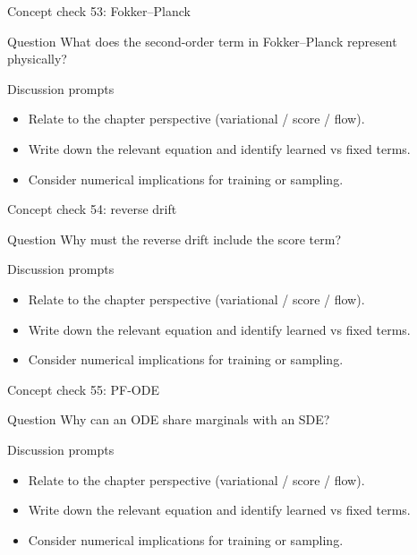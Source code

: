 \documentclass[aspectratio=169]{beamer}
\begin{document}
\begin{frame}{Concept check 53: Fokker--Planck}
\begin{block}{Question}
What does the second-order term in Fokker--Planck represent physically?
\end{block}
\begin{block}{Discussion prompts}
\begin{itemize}
\item Relate to the chapter perspective (variational / score / flow).
\item Write down the relevant equation and identify learned vs fixed terms.
\item Consider numerical implications for training or sampling.
\end{itemize}
\end{block}
\end{frame}

\begin{frame}{Concept check 54: reverse drift}
\begin{block}{Question}
Why must the reverse drift include the score term?
\end{block}
\begin{block}{Discussion prompts}
\begin{itemize}
\item Relate to the chapter perspective (variational / score / flow).
\item Write down the relevant equation and identify learned vs fixed terms.
\item Consider numerical implications for training or sampling.
\end{itemize}
\end{block}
\end{frame}

\begin{frame}{Concept check 55: PF-ODE}
\begin{block}{Question}
Why can an ODE share marginals with an SDE?
\end{block}
\begin{block}{Discussion prompts}
\begin{itemize}
\item Relate to the chapter perspective (variational / score / flow).
\item Write down the relevant equation and identify learned vs fixed terms.
\item Consider numerical implications for training or sampling.
\end{itemize}
\end{block}
\end{frame}
\end{document}
